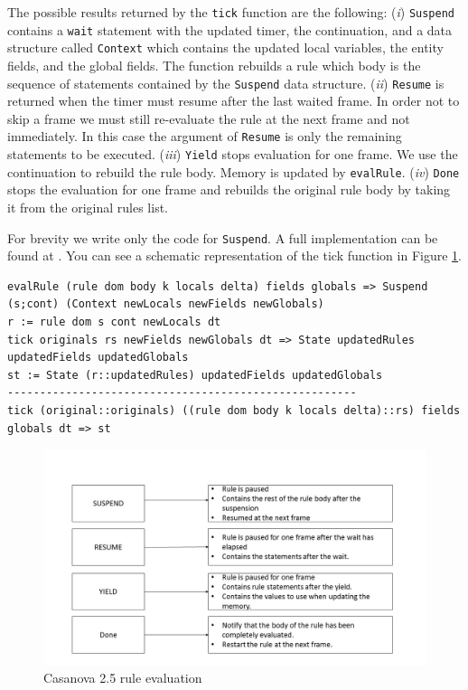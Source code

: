 The possible results returned by the \texttt{tick} function are the following: (\textit{i}) \texttt{Suspend} contains a \texttt{wait} statement with the updated timer, the continuation, and a data structure called \texttt{Context} which contains the updated local variables, the entity fields, and the global fields. The function rebuilds a rule which body is the sequence of statements contained by the \texttt{Suspend} data structure. (\textit{ii}) \texttt{Resume} is returned when the timer must resume after the last waited frame. In order not to skip a frame we must still re-evaluate the rule at the next frame and not immediately. In this case the argument of \texttt{Resume} is only the remaining statements to be executed. (\textit{iii}) \texttt{Yield} stops evaluation for one frame. We use the continuation to rebuild the rule body. Memory is updated by \texttt{evalRule}. (\textit{iv}) \texttt{Done} stops the evaluation for one frame and rebuilds the original rule body by taking it from the original rules list.

For brevity we write only the code for \texttt{Suspend}. A full implementation can be found at \cite{CASANOVA_SOURCE_CODE}. You can see a schematic representation of the tick function in Figure \ref{fig:tick}.

\begin{lstlisting}
evalRule (rule dom body k locals delta) fields globals => Suspend (s;cont) (Context newLocals newFields newGlobals)
r := rule dom s cont newLocals dt
tick originals rs newFields newGlobals dt => State updatedRules updatedFields updatedGlobals
st := State (r::updatedRules) updatedFields updatedGlobals
------------------------------------------------------
tick (original::originals) ((rule dom body k locals delta)::rs) fields globals dt => st
\end{lstlisting}


\begin{figure}
	\centering
	\includegraphics[scale = 0.25]{Figures/tick2}
	\caption{Casanova 2.5 rule evaluation}
	\label{fig:tick}
\end{figure}

